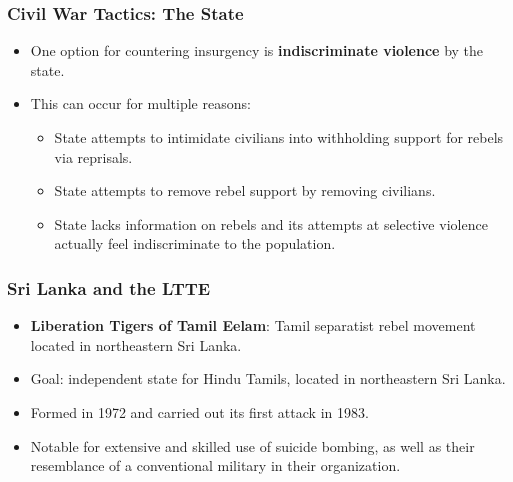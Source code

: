 \documentclass{beamer}
\begin{document}
\begin{frame} 
	\frametitle{\LARGE{Civil War Tactics: The State}}
	\begin{itemize}
		\item One option for countering insurgency is \textbf{indiscriminate violence} by the state. \pause 
		\item This can occur for multiple reasons: \pause
		\begin{itemize}
			\item State attempts to intimidate civilians into withholding support for rebels via reprisals. \pause
			\item State attempts to remove rebel support by removing civilians. \pause
			\item State lacks information on rebels and its attempts at selective violence actually feel indiscriminate to the population.
		\end{itemize}
	\end{itemize}
\end{frame}

\begin{frame} 
	\frametitle{\LARGE{Sri Lanka and the LTTE}}
	\begin{itemize}
		\item \textbf{Liberation Tigers of Tamil Eelam}: Tamil separatist rebel movement located in northeastern Sri Lanka. \pause
		\item Goal: independent state for Hindu Tamils, located in northeastern Sri Lanka. \pause
		\item Formed in 1972 and carried out its first attack in 1983. \pause
		\item Notable for extensive and skilled use of suicide bombing, as well as their resemblance of a conventional military in their organization.
	\end{itemize}
\end{frame}
\end{document}
